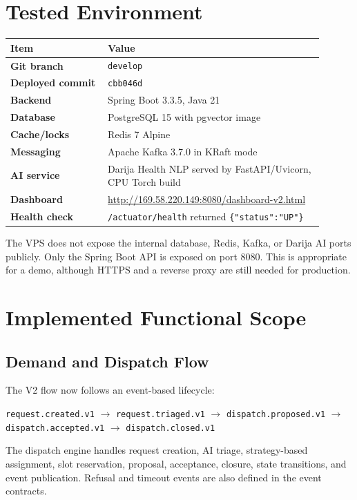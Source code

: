 \documentclass[11pt,a4paper]{article}
\newcommand{\code}[1]{\texttt{#1}}
\begin{document}
\section{Tested Environment}

\begin{longtable}{>{\bfseries}p{0.28\linewidth}p{0.62\linewidth}}
\toprule
Item & Value \\
\midrule
Git branch & \code{develop} \\
Deployed commit & \code{cbb046d} \\
Backend & Spring Boot 3.3.5, Java 21 \\
Database & PostgreSQL 15 with pgvector image \\
Cache/locks & Redis 7 Alpine \\
Messaging & Apache Kafka 3.7.0 in KRaft mode \\
AI service & Darija Health NLP served by FastAPI/Uvicorn, CPU Torch build \\
Dashboard & \url{http://169.58.220.149:8080/dashboard-v2.html} \\
Health check & \code{/actuator/health} returned \code{\{"status":"UP"\}} \\
\bottomrule
\end{longtable}

The VPS does not expose the internal database, Redis, Kafka, or Darija AI ports publicly. Only the Spring Boot API is exposed on port 8080. This is appropriate for a demo, although HTTPS and a reverse proxy are still needed for production.

\section{Implemented Functional Scope}

\subsection{Demand and Dispatch Flow}

The V2 flow now follows an event-based lifecycle:

\begin{center}
\code{request.created.v1} $\rightarrow$
\code{request.triaged.v1} $\rightarrow$
\code{dispatch.proposed.v1} $\rightarrow$
\code{dispatch.accepted.v1} $\rightarrow$
\code{dispatch.closed.v1}
\end{center}

The dispatch engine handles request creation, AI triage, strategy-based assignment, slot reservation, proposal, acceptance, closure, state transitions, and event publication. Refusal and timeout events are also defined in the event contracts.
\end{document}
